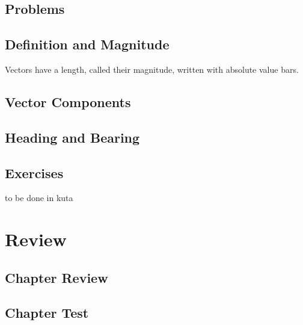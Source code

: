 \subsection{Problems}
\noindent{}
\newpage
\subsection{Definition and Magnitude}
Vectors have a length, called their magnitude, written with absolute value bars.
\subsection{Vector Components}
\subsection{Heading and Bearing}
\newpage
\subsection{Exercises}
to be done in kuta

\newpage
\section{Review}
\subsection{Chapter Review}
\subsection{Chapter Test}